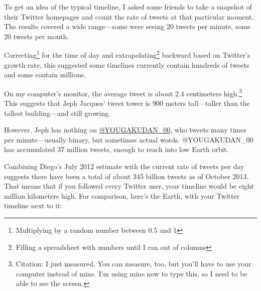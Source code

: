 {{To get an idea of the typical timeline, I asked some friends to take a snapshot of their Twitter homepages and count the rate of tweets at that particular moment. The results covered a wide range—some were seeing 20 tweets per minute, some 20 tweets per month.}

{Correcting{\footnote{Multiplying by a random number between 0.5 and 1} } for the time of day and extrapolating{\footnote{Filling a spreadsheet with numbers until I ran out of columns} } backward based on Twitter's growth rate, this suggested some timelines currently contain hundreds of tweets and some contain millions.}

{On my computer's monitor, the average tweet is about 2.4 centimeters high.{\footnote{Citation: I just measured. You can measure, too, but you'll have to use your computer instead of mine. I'm using mine now to type this, so I need to be able to see the screen.} } This suggests that Jeph Jacques' tweet tower is 900 meters tall—taller than the tallest building—and still growing.}

{However, Jeph has nothing on \href{https://twitter.com/YOUGAKUDAN\_00}{@YOUGAKUDAN\_00}, who tweets many times per minute—usually binary, but sometimes actual words. @YOUGAKUDAN\_00 has accumulated 37 million tweets, enough to reach into low Earth orbit.}

{Combining Diego's July 2012 estimate with the current rate of tweets per day suggests there have been a total of about 345 billion tweets as of October 2013. That means that if you followed every Twitter user, your timeline would be eight million kilometers high. For comparison, here's the Earth, with your Twitter timeline next to it:}

}
